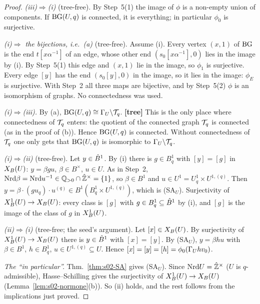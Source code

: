 \begin{proof}
\emph{(iii)$\Rightarrow$(i)} (tree-free). By Step~5(1) the image of $\phi$ is a non-empty union of components. If $\mathrm{BG}(U,q)$ is
connected, it is everything; in particular $\phi_0$ is surjective.

\emph{(i)$\Rightarrow$ the bijections, i.e.\ (a)} (tree-free). Assume (i). Every vertex $(x,1)$ of $\mathrm{BG}$ is the end $t[x\alpha^{-1}]$ of
an edge, whose other end $(s_0[x\alpha^{-1}],0)$ lies in the image by (i). By Step~5(1) this edge and $(x,1)$ lie in the image, so
$\phi_1$ is surjective. Every edge $[y]$ has the end $(s_0[y],0)$ in the image, so it lies in the image: $\phi_E$ is surjective.
With Step~2 all three maps are bijective, and by Step~5(2) $\phi$ is an isomorphism of graphs. No connectedness was used.

\emph{(i)$\Rightarrow$(iii).} By (a), $\mathrm{BG}(U,q)\cong\Gamma_U\backslash\mathcal{T}_q$. \textbf{[tree]} This is the only place where connectedness of
$\mathcal{T}_q$ enters: the quotient of the connected graph $\mathcal{T}_q$ is connected (as in the proof of (b)). Hence $\mathrm{BG}(U,q)$ is connected.
Without connectedness of $\mathcal{T}_q$ one only gets that $\mathrm{BG}(U,q)$ is isomorphic to $\Gamma_U\backslash\mathcal{T}_q$.

\emph{(i)$\Rightarrow$(ii)} (tree-free). Let $y\in\hat{B}^1$. By (i) there is $g\in B^1_q$ with $[y]=[g]$ in $X_B(U)$: $y=\beta gu$,
$\beta\in B^\times$, $u\in U$. As in Step~2, $\mathrm{Nrd}\beta=\mathrm{Nrd} u^{-1}\in\mathbb{Q}_{>0}\cap\hat{\mathbb{Z}}^\times=\{1\}$, so $\beta\in B^1$ and $u\in U^1=U^1_q\times
U^{1,(q)}$. Then $y=\beta\cdot(gu_q)\cdot u^{(q)}\in B^1(B^1_q\times U^{1,(q)})$, which is (SA$_U$). Surjectivity of $X^1_B(U)\to X_B(U)$:
every class is $[g]$ with $g\in B^1_q\subseteq\hat{B}^1$ by (i), and $[g]$ is the image of the class of $g$ in $X^1_B(U)$.

\emph{(ii)$\Rightarrow$(i)} (tree-free; the seed's argument). Let $[x]\in X_B(U)$. By surjectivity of $X^1_B(U)\to X_B(U)$ there is
$y\in\hat{B}^1$ with $[x]=[y]$. By (SA$_U$), $y=\beta hu$ with $\beta\in B^1$, $h\in B^1_q$, $u\in U^{1,(q)}\subseteq U$. Hence
$[x]=[y]=[h]=\phi_0(\Gamma_U hv_0)$.

\emph{The ``in particular''.} Thm.~\ref{thm:s02-SA} gives (SA$_U$). Since $\mathrm{Nrd} U=\hat{\mathbb{Z}}^\times$ ($U$ is $q$-admissible), Hasse--Schilling
gives the surjectivity of $X^1_B(U)\to X_B(U)$ (Lemma~\ref{lem:s02-normone}(b)). So (ii) holds, and the rest follows from the
implications just proved.
\end{proof}

